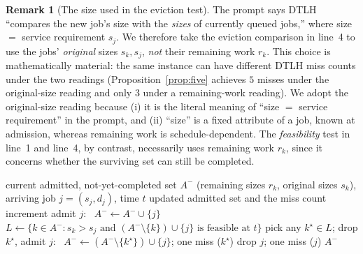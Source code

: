 \documentclass{amsart}
\theoremstyle{definition}
\newtheorem{remark}[theorem]{Remark}
\begin{document}
\begin{remark}[The size used in the eviction test]\label{rem:sizeconv}
The prompt says DTLH ``compares the new job's size with the \emph{sizes} of
currently queued jobs,'' where size $=$ service requirement $s_j$. We therefore
take the eviction comparison in line~4 to use the jobs' \emph{original} sizes
$s_k,s_j$, \emph{not} their remaining work $r_k$. This choice is mathematically
material: the same instance can have different DTLH miss counts under the two
readings (Proposition~\ref{prop:five} achieves $5$ misses under the
original-size reading and only $3$ under a remaining-work reading). We adopt the
original-size reading because (i) it is the literal meaning of ``size $=$ service
requirement'' in the prompt, and (ii) ``size'' is a fixed attribute of a job,
known at admission, whereas remaining work is schedule-dependent. The
\emph{feasibility} test in line~1 and line~4, by contrast, necessarily uses
remaining work $r_k$, since it concerns whether the surviving set can still be
completed.
\end{remark}

\begin{algorithm}[h]
\caption{DTLH admission decision at the arrival of job $j$ at time $t$}
\label{alg:dtlh}
\begin{algorithmic}[1]
\Require current admitted, not-yet-completed set $A^-$ (remaining sizes $r_k$, original sizes $s_k$), arriving job $j=(s_j,d_j)$, time $t$
\Ensure updated admitted set and the miss count increment
  \State admit $j$: \ $A^-\gets A^-\cup\{j\}$
\Else
  \State $L\gets\{k\in A^- : s_k> s_j \text{ and } (A^-\setminus\{k\})\cup\{j\}\text{ is feasible at }t\}$
    \State pick any $k^\star\in L$; drop $k^\star$, admit $j$: \ $A^-\gets(A^-\setminus\{k^\star\})\cup\{j\}$; one miss ($k^\star$)
  \Else
    \State drop $j$; one miss ($j$)
  \EndIf
\EndIf
\State \Return $A^-$
\end{algorithmic}
\end{algorithm}
\end{document}

